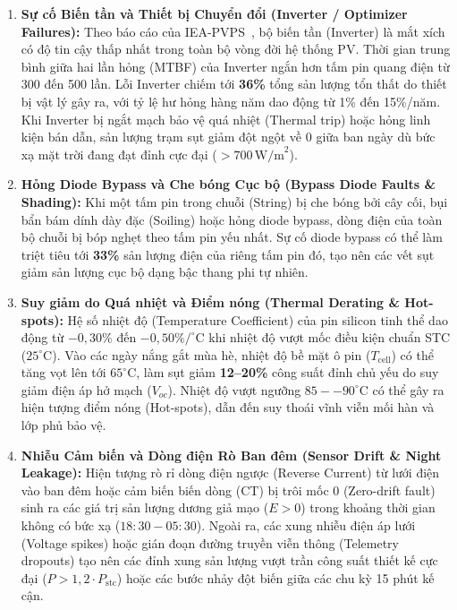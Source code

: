 \documentclass[12pt, a4paper]{report}
\begin{document}
\begin{enumerate}[label=\arabic*., leftmargin=*]
    \item \textbf{Sự cố Biến tần và Thiết bị Chuyển đổi (Inverter / Optimizer Failures):}
    Theo báo cáo của IEA-PVPS~\cite{iea2023pvps}, bộ biến tần (Inverter) là mắt xích có độ tin cậy thấp nhất trong toàn bộ vòng đời hệ thống PV. Thời gian trung bình giữa hai lần hỏng (MTBF) của Inverter ngắn hơn tấm pin quang điện từ 300 đến 500 lần. Lỗi Inverter chiếm tới \textbf{36\%} tổng sản lượng tổn thất do thiết bị vật lý gây ra, với tỷ lệ hư hỏng hàng năm dao động từ 1\% đến 15\%/năm. Khi Inverter bị ngắt mạch bảo vệ quá nhiệt (Thermal trip) hoặc hỏng linh kiện bán dẫn, sản lượng trạm sụt giảm đột ngột về 0 giữa ban ngày dù bức xạ mặt trời đang đạt đỉnh cực đại ($> 700 \, \text{W/m}^2$).

    \item \textbf{Hỏng Diode Bypass và Che bóng Cục bộ (Bypass Diode Faults \& Shading):}
    Khi một tấm pin trong chuỗi (String) bị che bóng bởi cây cối, bụi bẩn bám dính dày đặc (Soiling) hoặc hỏng diode bypass, dòng điện của toàn bộ chuỗi bị bóp nghẹt theo tấm pin yếu nhất. Sự cố diode bypass có thể làm triệt tiêu tới \textbf{33\%} sản lượng điện của riêng tấm pin đó, tạo nên các vết sụt giảm sản lượng cục bộ dạng bậc thang phi tự nhiên.

    \item \textbf{Suy giảm do Quá nhiệt và Điểm nóng (Thermal Derating \& Hot-spots):}
    Hệ số nhiệt độ (Temperature Coefficient) của pin silicon tinh thể dao động từ $-0{,}30\%$ đến $-0{,}50\%/^\circ\text{C}$ khi nhiệt độ vượt mốc điều kiện chuẩn STC ($25^\circ\text{C}$). Vào các ngày nắng gắt mùa hè, nhiệt độ bề mặt ô pin ($T_{\text{cell}}$) có thể tăng vọt lên tới $65^\circ\text{C}$, làm sụt giảm \textbf{12--20\%} công suất đỉnh chủ yếu do suy giảm điện áp hở mạch ($V_{oc}$). Nhiệt độ vượt ngưỡng $85--90^\circ\text{C}$ có thể gây ra hiện tượng điểm nóng (Hot-spots), dẫn đến suy thoái vĩnh viễn mối hàn và lớp phủ bảo vệ.

    \item \textbf{Nhiễu Cảm biến và Dòng điện Rò Ban đêm (Sensor Drift \& Night Leakage):}
    Hiện tượng rò rỉ dòng điện ngược (Reverse Current) từ lưới điện vào ban đêm hoặc cảm biến biến dòng (CT) bị trôi mốc 0 (Zero-drift fault) sinh ra các giá trị sản lượng dương giả mạo ($E > 0$) trong khoảng thời gian không có bức xạ ($18:30 - 05:30$). Ngoài ra, các xung nhiễu điện áp lưới (Voltage spikes) hoặc gián đoạn đường truyền viễn thông (Telemetry dropouts) tạo nên các đỉnh xung sản lượng vượt trần công suất thiết kế cực đại ($P > 1{,}2 \cdot P_{\text{stc}}$) hoặc các bước nhảy đột biến giữa các chu kỳ 15 phút kế cận.
\end{enumerate}
\end{document}
